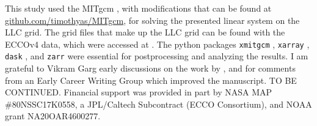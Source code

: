 \documentclass[draft]{Feb-3-22-latex-templates/agujournal2019}
\begin{document}










\appendix




%

\acknowledgments
This study used the MITgcm \citep{campin_mitgcmmitgcm_2021}, with modifications
that can be found at \url{github.com/timothyas/MITgcm}, for solving the
presented linear system on the LLC grid.
The grid files that make up the LLC grid can be found with the ECCOv4 data,
which were accessed at \citep{ecco_v4r2}.
The python packages \texttt{xmitgcm} \citep{abernathey_2021_5139886},
\texttt{xarray} \citep{hoyer2017xarray}, \texttt{dask} \citep{dask}, and
\texttt{zarr} \citep{alistair_miles_2020_3773450}
were essential for postprocessing and analyzing the results.
I am grateful to Vikram Garg early discussions on the
work by \citet{RSSB:RSSB777}, and for comments from an Early Career Writing
Group which improved the manuscript.
TO BE CONTINUED.
Financial support was provided in part by NASA MAP \#80NSSC17K0558, a JPL/Caltech
Subcontract (ECCO Consortium), and NOAA grant NA20OAR4600277.


\end{document}
